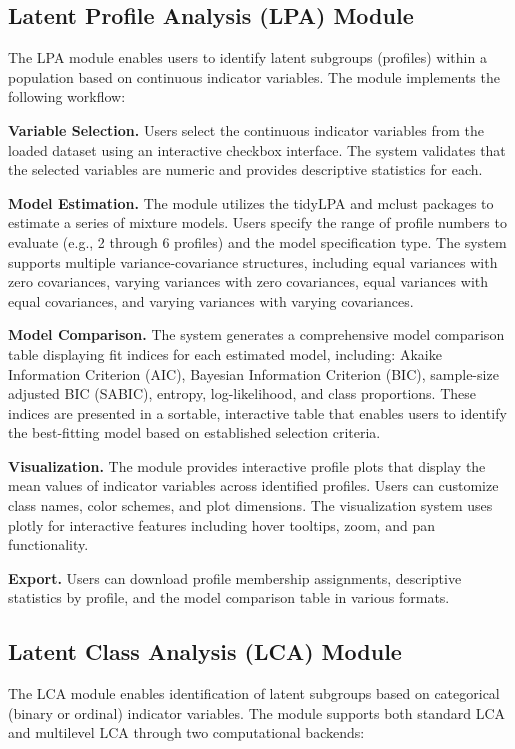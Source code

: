 \documentclass[12pt,a4paper]{article}
\begin{document}
\subsection{Latent Profile Analysis (LPA) Module}

The LPA module enables users to identify latent subgroups (profiles) within a population based on continuous indicator variables. The module implements the following workflow:

\textbf{Variable Selection.} Users select the continuous indicator variables from the loaded dataset using an interactive checkbox interface. The system validates that the selected variables are numeric and provides descriptive statistics for each.

\textbf{Model Estimation.} The module utilizes the tidyLPA and mclust packages to estimate a series of mixture models. Users specify the range of profile numbers to evaluate (e.g., 2 through 6 profiles) and the model specification type. The system supports multiple variance-covariance structures, including equal variances with zero covariances, varying variances with zero covariances, equal variances with equal covariances, and varying variances with varying covariances.

\textbf{Model Comparison.} The system generates a comprehensive model comparison table displaying fit indices for each estimated model, including: Akaike Information Criterion (AIC), Bayesian Information Criterion (BIC), sample-size adjusted BIC (SABIC), entropy, log-likelihood, and class proportions. These indices are presented in a sortable, interactive table that enables users to identify the best-fitting model based on established selection criteria.

\textbf{Visualization.} The module provides interactive profile plots that display the mean values of indicator variables across identified profiles. Users can customize class names, color schemes, and plot dimensions. The visualization system uses plotly for interactive features including hover tooltips, zoom, and pan functionality.

\textbf{Export.} Users can download profile membership assignments, descriptive statistics by profile, and the model comparison table in various formats.

\subsection{Latent Class Analysis (LCA) Module}

The LCA module enables identification of latent subgroups based on categorical (binary or ordinal) indicator variables. The module supports both standard LCA and multilevel LCA through two computational backends:
\end{document}
